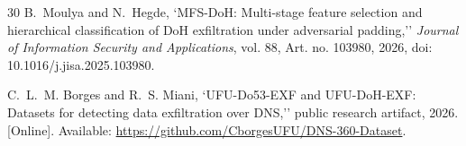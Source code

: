 \documentclass[conference]{IEEEtran}
\begin{document}
\begin{thebibliography}{30}
B.~Moulya and N.~Hegde, `MFS-DoH: Multi-stage feature selection and hierarchical classification of DoH exfiltration under adversarial padding,'' \emph{Journal of Information Security and Applications}, vol. 88, Art. no. 103980, 2026, doi: 10.1016/j.jisa.2025.103980.

C.~L.~M. Borges and R.~S. Miani, `UFU-Do53-EXF and UFU-DoH-EXF: Datasets for detecting data exfiltration over DNS,'' public research artifact, 2026. [Online]. Available: \url{https://github.com/CborgesUFU/DNS-360-Dataset}.

\end{thebibliography}
\end{document}
